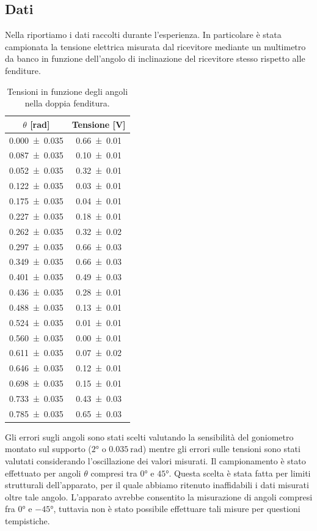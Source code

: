\documentclass[a4paper]{article}
\begin{document}
\subsection{Dati}
Nella  riportiamo i dati raccolti durante l'esperienza. In particolare è stata campionata la tensione elettrica misurata dal ricevitore mediante un multimetro da banco in funzione dell'angolo di inclinazione del ricevitore stesso rispetto alle fenditure.
\begin{table}[H]
\centering
\caption{Tensioni in funzione degli angoli nella doppia fenditura.}
\label{tab:dati_doppia_fenditura}
\begin{tabular}{|c|c|}
\hline
$\theta$ [\si{\radian}] & Tensione [\si{\volt}] \\
\hline
\num{0.000 \pm 0.035} & \num{0.66 \pm 0.01} \\
\num{0.087 \pm 0.035} & \num{0.10 \pm 0.01} \\
\num{0.052 \pm 0.035} & \num{0.32 \pm 0.01} \\
\num{0.122 \pm 0.035} & \num{0.03 \pm 0.01} \\
\num{0.175 \pm 0.035} & \num{0.04 \pm 0.01} \\
\num{0.227 \pm 0.035} & \num{0.18 \pm 0.01} \\
\num{0.262 \pm 0.035} & \num{0.32 \pm 0.02} \\
\num{0.297 \pm 0.035} & \num{0.66 \pm 0.03} \\
\num{0.349 \pm 0.035} & \num{0.66 \pm 0.03} \\
\num{0.401 \pm 0.035} & \num{0.49 \pm 0.03} \\
\num{0.436 \pm 0.035} & \num{0.28 \pm 0.01} \\
\num{0.488 \pm 0.035} & \num{0.13 \pm 0.01} \\
\num{0.524 \pm 0.035} & \num{0.01 \pm 0.01} \\
\num{0.560 \pm 0.035} & \num{0.00 \pm 0.01} \\
\num{0.611 \pm 0.035} & \num{0.07 \pm 0.02} \\
\num{0.646 \pm 0.035} & \num{0.12 \pm 0.01} \\
\num{0.698 \pm 0.035} & \num{0.15 \pm 0.01} \\
\num{0.733 \pm 0.035} & \num{0.43 \pm 0.03} \\
\num{0.785 \pm 0.035} & \num{0.65 \pm 0.03} \\
\hline
\end{tabular}
\end{table}
Gli errori sugli angoli sono stati scelti valutando la sensibilità del goniometro montato sul supporto ($\ang{2}$ o $\SI{0.035}{\radian}$) mentre gli errori sulle tensioni sono stati valutati considerando l'oscillazione dei valori misurati. Il campionamento è stato effettuato per angoli $\theta$ compresi tra $\ang{0}$ e $\ang{45}$. Questa scelta è stata fatta per limiti strutturali dell'apparato, per il quale abbiamo ritenuto inaffidabili i dati misurati oltre tale angolo. L'apparato avrebbe consentito la misurazione di angoli compresi fra $\ang{0}$ e $\ang{-45}$, tuttavia non è stato possibile effettuare tali misure per questioni tempistiche.
\end{document}
